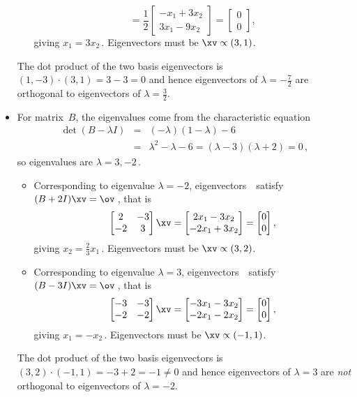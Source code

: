 \begin{example}
\begin{solution}
\begin{itemize}
\begin{itemize}
\begin{equation*}
=\frac12\begin{bmatrix} -x_1+3x_2\\3x_1-9x_2 \end{bmatrix}
=\begin{bmatrix} 0\\0 \end{bmatrix},
\end{equation*}
giving \(x_1=3x_2\)\,.  
Eigenvectors must be \(\xv\propto(3,1)\).
\end{itemize}
The dot product of the two basis eigenvectors is \((1,-3)\cdot(3,1)=3-3=0\) and hence eigenvectors of \(\lambda=-\frac72\) are orthogonal to eigenvectors of \(\lambda=\frac32\).

\item For matrix~\(B\), the eigenvalues come from the characteristic equation
\begin{eqnarray*}
\det(B-\lambda I)&=&(-\lambda)(1-\lambda)-6
\\&=&\lambda^2-\lambda-6
=(\lambda-3)(\lambda+2)=0\,,
\end{eqnarray*}
so eigenvalues are \(\lambda=3,-2\)\,.
\begin{itemize}
\item Corresponding to eigenvalue \(\lambda=-2\), eigenvectors~\xv\ satisfy \((B+2I)\xv=\ov\)\,, that is
\begin{equation*}
\begin{bmatrix} 2&-3\\-2&3 \end{bmatrix}\xv
=\begin{bmatrix} 2x_1-3x_2\\-2x_1+3x_2 \end{bmatrix}
=\begin{bmatrix} 0\\0 \end{bmatrix},
\end{equation*}
giving \(x_2=\tfrac23x_1\)\,.  
Eigenvectors must be \(\xv\propto(3,2)\).
\item Corresponding to eigenvalue \(\lambda=3\), eigenvectors~\xv\ satisfy \((B-3I)\xv=\ov\)\,, that is
\begin{equation*}
\begin{bmatrix} -3&-3\\-2&-2 \end{bmatrix}\xv
=\begin{bmatrix} -3x_1-3x_2\\-2x_1-2x_2 \end{bmatrix}
=\begin{bmatrix} 0\\0 \end{bmatrix},
\end{equation*}
giving \(x_1=-x_2\)\,.  Eigenvectors must be \(\xv\propto(-1,1)\).
\end{itemize}
The dot product of the two basis eigenvectors is \((3,2)\cdot(-1,1)=-3+2=-1\neq 0\) and hence eigenvectors of \(\lambda=3\) are \emph{not} orthogonal to eigenvectors of \(\lambda=-2\).


\end{itemize}
\end{solution}
\end{example}

